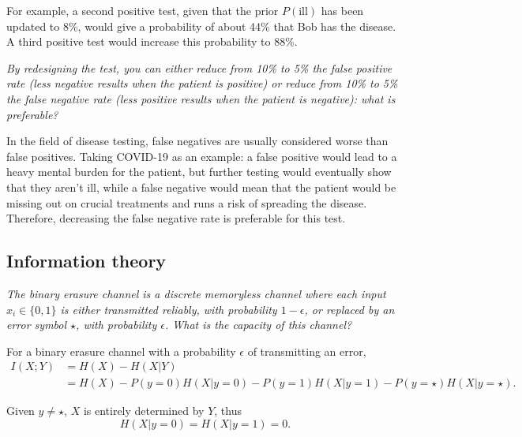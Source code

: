 \documentclass[12pt]{article}
\begin{document}
  For example, a second positive test, given that the prior $P(\text{ill})$ has
  been updated to 8\%, would give a probability of about 44\% that Bob has the
  disease. A third positive test would increase this probability to 88\%.

  \begin{displayquote}
    \itshape{}
    By redesigning the test, you can either reduce from 10\% to 5\% the false
    positive rate (less negative results when the patient is positive) or
    reduce from 10\% to 5\% the false negative rate (less positive results when
    the patient is negative): what is preferable?
  \end{displayquote}

  In the field of disease testing, false negatives are usually considered worse
  than false positives. Taking COVID-19 as an example: a false positive would
  lead to a heavy mental burden for the patient, but further testing would
  eventually show that they aren't ill, while a false negative would mean that
  the patient would be missing out on crucial treatments and runs a risk of
  spreading the disease. Therefore, decreasing the false negative rate is
  preferable for this test.

  \subsection{Information theory}

  \begin{displayquote}
    \itshape{}
    The binary erasure channel is a discrete memoryless channel where each
    input $x_i \in \{0, 1\}$ is either transmitted reliably, with probability
    $1-\epsilon$, or replaced by an error symbol $\star$, with probability
    $\epsilon$. What is the capacity of this channel?
  \end{displayquote}

  For a binary erasure channel with a probability $\epsilon$ of transmitting an
  error,
  \begin{equation}
    \begin{split}
      I(X; Y) &= H(X) - H(X | Y)\\
      &= H(X) - P(y = 0) H(X | y = 0) - P(y = 1) H(X | y = 1) - P(y = \star) H(X
        | y = \star).
    \end{split}
  \end{equation}

  Given $y \neq \star$, $X$ is entirely determined by $Y$, thus
  \begin{equation}
    H(X | y = 0) = H(X | y = 1) = 0.
  \end{equation}
\end{document}
